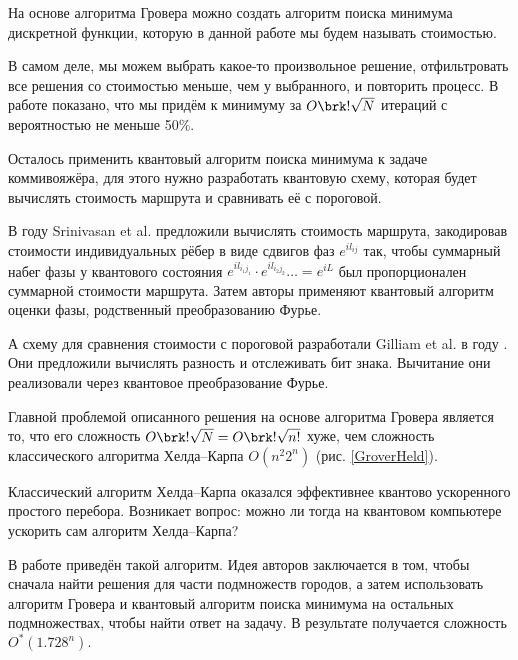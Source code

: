 На основе алгоритма Гровера можно создать алгоритм поиска минимума дискретной функции, которую в данной работе мы будем называть стоимостью. 

В самом деле, мы можем выбрать какое-то произвольное решение, отфильтровать все решения со стоимостью меньше, чем у выбранного, и повторить процесс. В работе \citeauthor{GroverMinima} \cite{GroverMinima} показано, что мы придём к минимуму за $O\brk!{\sqrt N}$ итераций с вероятностью не меньше 50\%.

Осталось применить квантовый алгоритм поиска минимума к задаче коммивояжёра, для этого нужно разработать квантовую схему, которая будет вычислять стоимость маршрута и сравнивать её с пороговой. 

В \citeyear{IBM} году Srinivasan et al. \cite{IBM} предложили вычислять стоимость маршрута, закодировав стоимости индивидуальных рёбер в виде сдвигов фаз $e^{i l_{ij}}$ так, чтобы суммарный набег фазы у квантового состояния $e^{i l_{i_1 j_1}} \cdot e^{i l_{i_2 j_2}} \dots = e^{iL}$ был пропорционален суммарной стоимости маршрута. Затем авторы применяют квантовый алгоритм оценки фазы, родственный преобразованию Фурье.

А схему для сравнения стоимости с пороговой разработали Gilliam et al. в \citeyear{GAS} году \cite{GAS}. Они предложили вычислять разность и отслеживать бит знака. Вычитание они реализовали через квантовое преобразование Фурье.

Главной проблемой описанного решения на основе алгоритма Гровера является то, что его сложность
$O\brk!{\sqrt{N}} = O\brk!{\sqrt{n!}}$ хуже, чем сложность классического алгоритма Хелда--Карпа $O(n^2 2^n)$ (рис. \ref{GroverHeld}).




Классический алгоритм Хелда--Карпа оказался эффективнее квантово ускоренного простого перебора. 
Возникает вопрос: можно ли тогда на квантовом компьютере ускорить сам алгоритм Хелда--Карпа?

В работе \cite{quantHeldKarp} приведён такой алгоритм. Идея авторов заключается в том, чтобы сначала найти решения для части подмножеств городов, а затем использовать алгоритм Гровера и квантовый алгоритм поиска минимума на остальных подмножествах, чтобы найти ответ на задачу. В результате получается сложность $O^*(1.728^n).$

